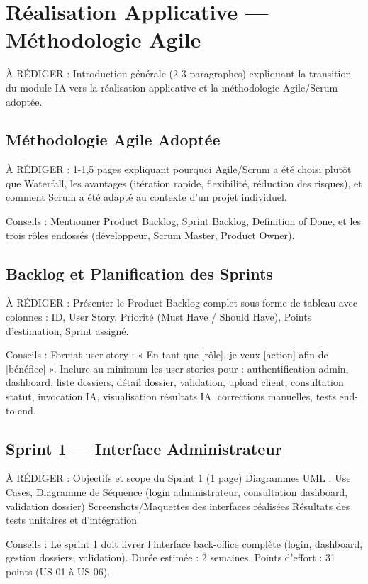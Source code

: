 \chapter{Réalisation Applicative --- Méthodologie Agile}

À RÉDIGER : Introduction générale (2-3 paragraphes) expliquant la transition du module IA vers la réalisation applicative et la méthodologie Agile/Scrum adoptée.

\section{Méthodologie Agile Adoptée}

À RÉDIGER : 1-1,5 pages expliquant pourquoi Agile/Scrum a été choisi plutôt que Waterfall, les avantages (itération rapide, flexibilité, réduction des risques), et comment Scrum a été adapté au contexte d'un projet individuel.

Conseils : Mentionner Product Backlog, Sprint Backlog, Definition of Done, et les trois rôles endossés (développeur, Scrum Master, Product Owner).

\section{Backlog et Planification des Sprints}

À RÉDIGER : Présenter le Product Backlog complet sous forme de tableau avec colonnes : ID, User Story, Priorité (Must Have / Should Have), Points d'estimation, Sprint assigné.

Conseils : Format user story : « En tant que [rôle], je veux [action] afin de [bénéfice] ». 
Inclure au minimum les user stories pour : authentification admin, dashboard, liste dossiers, détail dossier, validation, upload client, consultation statut, invocation IA, visualisation résultats IA, corrections manuelles, tests end-to-end.

\section{Sprint 1 --- Interface Administrateur}

À RÉDIGER : Objectifs et scope du Sprint 1 (1 page)
Diagrammes UML : Use Cases, Diagramme de Séquence (login administrateur, consultation dashboard, validation dossier)
Screenshots/Maquettes des interfaces réalisées
Résultats des tests unitaires et d'intégration

Conseils : Le sprint 1 doit livrer l'interface back-office complète (login, dashboard, gestion dossiers, validation). Durée estimée : 2 semaines. Points d'effort : 31 points (US-01 à US-06).

